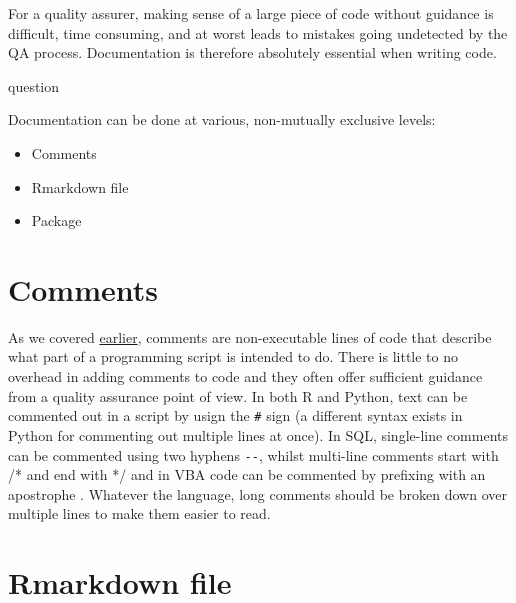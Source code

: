 \documentclass[
]{book}
\providecommand{\tightlist}{%
  \setlength{\itemsep}{0pt}\setlength{\parskip}{0pt}}
\begin{document}
For a quality assurer, making sense of a large piece of code without guidance is difficult, time consuming, and at worst leads to mistakes going undetected by the QA process. Documentation is therefore absolutely essential when writing code.

\begin{infoboxyellow}question

Documentation can be done at various, non-mutually exclusive levels:

\begin{itemize}
\tightlist
\item
  Comments
\item
  Rmarkdown file
\item
  Package
\end{itemize}

\end{infoboxyellow}

\hypertarget{comments}{%
\section{Comments}\label{comments}}

As we covered \protect\hyperlink{fundamentals}{earlier}, comments are non-executable lines of code that describe what part of a programming script is intended to do. There is little to no overhead in adding comments to code and they often offer sufficient guidance from a quality assurance point of view. In both R and Python, text can be commented out in a script by usign the \texttt{\#} sign (a different syntax exists in Python for commenting out multiple lines at once). In SQL, single-line comments can be commented using two hyphens \texttt{-\/-}, whilst multi-line comments start with /* and end with */ and in VBA code can be commented by prefixing with an apostrophe \texttt{\textquotesingle{}}. Whatever the language, long comments should be broken down over multiple lines to make them easier to read.

\hypertarget{rmarkdown-file}{%
\section{Rmarkdown file}\label{rmarkdown-file}}
\end{document}

